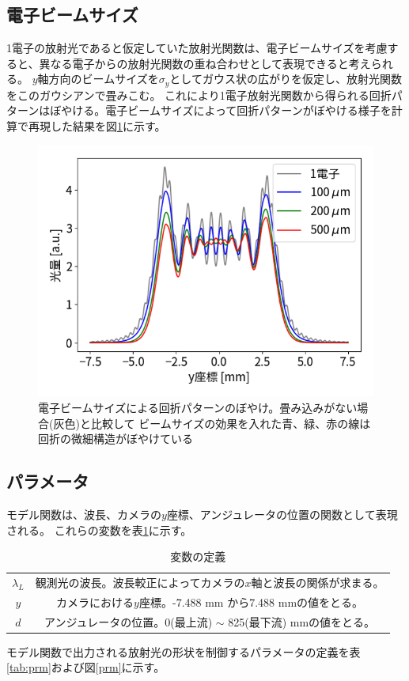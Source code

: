 \documentclass[a4paper,11pt,uplatex]{jsbook}
\begin{document}
\subsection{電子ビームサイズ}
1電子の放射光であると仮定していた放射光関数は、電子ビームサイズを考慮すると、異なる電子からの放射光関数の重ね合わせとして表現できると考えられる。
$y$軸方向のビームサイズを$\sigma_y$としてガウス状の広がりを仮定し、放射光関数をこのガウシアンで畳みこむ。
これにより1電子放射光関数から得られる回折パターンはぼやける。電子ビームサイズによって回折パターンがぼやける様子を計算で再現した結果を図\ref{beamsize}に示す。
\begin{figure}[h]
  \centering
  \includegraphics[width=0.8\linewidth]{image/4-esize.png}
  \caption[電子ビームサイズによる回折パターンのぼやけ]{電子ビームサイズによる回折パターンのぼやけ。畳み込みがない場合(灰色)と比較して
  ビームサイズの効果を入れた青、緑、赤の線は回折の微細構造がぼやけている}\label{beamsize}
\end{figure}

\subsection{パラメータ}
モデル関数は、波長、カメラの$y$座標、アンジュレータの位置の関数として表現される。
これらの変数を表\ref{tab:variables}に示す。
\begin{table}[h]
  \centering
  \begin{tabular}{c|c}
    $\lambda_L$ & 観測光の波長。波長較正によってカメラの$x$軸と波長の関係が求まる。\\
    $y$ & カメラにおける$y$座標。-7.488 mm から7.488 mmの値をとる。\\
    $d$ & アンジュレータの位置。0(最上流) $\sim$ 825(最下流) mmの値をとる。\\
  \end{tabular}
  \caption[変数の定義]{変数の定義}\label{tab:variables}
\end{table}
モデル関数で出力される放射光の形状を制御するパラメータの定義を表\ref{tab:prm}および図\ref{prm}に示す。
\end{document}
